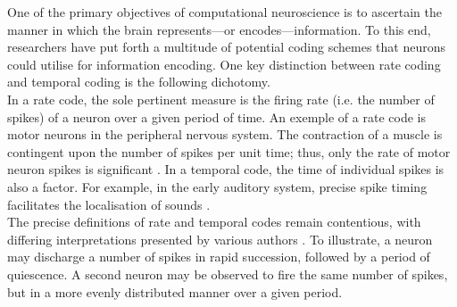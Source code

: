 \noindent One of the primary objectives of computational neuroscience is to ascertain the manner in which the brain represents—or encodes—information. To this end, researchers have put forth a multitude of potential coding schemes that neurons could utilise for information encoding. One key distinction between rate coding and temporal coding is the following dichotomy. \\

\noindent In a rate code, the sole pertinent measure is the firing rate (i.e. the number of spikes) of a neuron over a given period of time. An exemple of a rate code is motor neurons in the peripheral nervous system. The contraction of a muscle is contingent upon the number of spikes per unit time; thus, only the rate of motor neuron spikes is significant \cite{gerstner1997neural}. In a temporal code, the time of individual spikes is also a factor. For example, in the early auditory system, precise spike timing facilitates the localisation of sounds \cite{chase2006spike}.\\

\noindent The precise definitions of rate and temporal codes remain contentious, with differing interpretations presented by various authors \cite{dayan2005theoretical}. To illustrate, a neuron may discharge a number of spikes in rapid succession, followed by a period of quiescence. A second neuron may be observed to fire the same number of spikes, but in a more evenly distributed manner over a given period. \\



